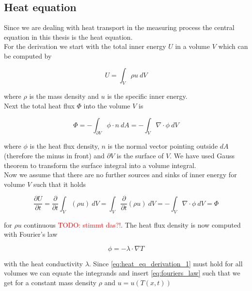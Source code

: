 \documentclass{scrartcl}[12pt, halfparskip]
\newcommand{\todo}[1]{\textcolor{red}{TODO: #1}}
\begin{document}
\subsection{Heat equation}
\label{sec:heat_equation}

Since we are dealing with heat transport in the measuring process the central equation in this thesis is the heat equation. \\
For the derivation \cite{lit:waerme_und_stoffuebertragung}
we start with the total inner energy $U$ in a volume $V$ which can be computed by

\begin{equation}
	U = \int_{V} \rho u \ dV
\end{equation}

where $\rho$ is the mass density and $u$ is the specific inner energy. \\
Next the total heat flux $\varPhi$ into the volume $V$ is

\begin{equation}
	\varPhi = - \int_{\partial V} \phi \cdot n \ dA = - \int_{V} \nabla \cdot \phi \ dV
\end{equation}

where $\phi$ is the heat flux density, $n$ is the normal vector pointing outside $dA$ (therefore the minus in front) and $\partial V$ is the surface of $V$. We have used Gauss theorem to transform the surface integral into a volume integral. \\
Now we assume that there are no further sources and sinks of inner energy for volume $V$ such that it holds

\begin{equation}
	\frac{\partial U}{\partial t} = \frac{\partial}{\partial t} \int_V (\rho u) \ dV = \int_V \frac{\partial}{\partial t}(\rho u) \ dV = - \int_{V} \nabla \cdot \phi \ dV = \varPhi
	\label{eq:heat_eq_derivation_1}
\end{equation}

for $\rho u$ continuous \todo{stimmt das?!}. The heat flux density is now computed with Fourier's law

\begin{equation}
	\phi = - \lambda \cdot \nabla T
	\label{eq:fouriers_law}
\end{equation}

with the heat conductivity $\lambda$. Since \eqref{eq:heat_eq_derivation_1} must hold for all volumes we can equate the integrands and insert \eqref{eq:fouriers_law} such that we get for a constant mass density $\rho$ and $u = u(T(x,t))$
\end{document}
